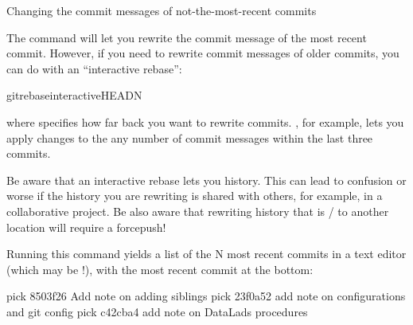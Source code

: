 \ignorespaces \begin{findoutmore}[label={fom-rebase1}, before title={\thetcbcounter\ }, float, check odd page=true]{Changing the commit messages of not-the-most-recent commits}
\label{\detokenize{basics/101-137-history:fom-rebase1}}

\sphinxAtStartPar
The  command will let you
rewrite the commit message of the most recent commit. However, if you
need to rewrite commit messages of older commits, you
can do with an “interactive rebase”:

\begin{sphinxVerbatim}[commandchars=\\\{\}]
gitrebase\PYGZhy{}\PYGZhy{}interactiveHEAD\PYGZti{}N
\end{sphinxVerbatim}

\sphinxAtStartPar
where  specifies how far back you want to rewrite commits.
, for example, lets you apply changes to the
any number of commit messages within the last three commits.

\sphinxAtStartPar
Be aware that an interactive rebase lets you  history.
This can lead to confusion or worse if the history you are rewriting
is shared with others, for example, in a collaborative project. Be also aware
that rewriting history that is / to another location
will require a force\sphinxhyphen{}push!

\sphinxAtStartPar
Running this command yields a list of the N most recent commits
in a text editor (which may be {\hyperref[\detokenize{glossary:term-vim}]{}}!), with
the most recent commit at the bottom:

\begin{sphinxVerbatim}[commandchars=\\\{\}]
pick 8503f26 Add note on adding siblings
pick 23f0a52 add note on configurations and git config
pick c42cba4 add note on DataLad\PYGZsq{}s procedures


\end{sphinxVerbatim}
\end{findoutmore}
